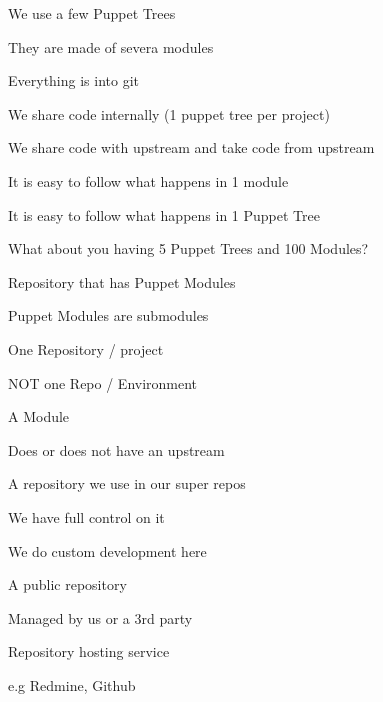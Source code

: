 \titleSlide
\inuitsSlide
{}
\begin{iframe}
\item We use a few Puppet Trees
\item They are made of severa modules
\item Everything is into git
\item We share code internally (1 puppet tree per project)
\item We share code with upstream and take code from upstream
\end{iframe}
\begin{iframe}
\item It is easy to follow what happens in 1 module
\item It is easy to follow what happens in 1 Puppet Tree
\item What about you having 5 Puppet Trees and 100 Modules?
\end{iframe}
\begin{iframe}
    \item Repository that has Puppet Modules
    \item Puppet Modules are submodules
    \item One Repository / project
    \item NOT one Repo / Environment
\end{iframe}
\begin{iframe}[Repository]
    \item A Module
    \item Does or does not have an upstream
\end{iframe}
\begin{iframe}
    \item A repository we use in our super repos
    \item We have full control on it
    \item We do custom development here
\end{iframe}
\begin{iframe}
    \item A public repository
    \item Managed by us or a 3rd party
\end{iframe}
\begin{iframe}[Source]
    \item Repository hosting service
    \item e.g Redmine, Github
\end{iframe}
